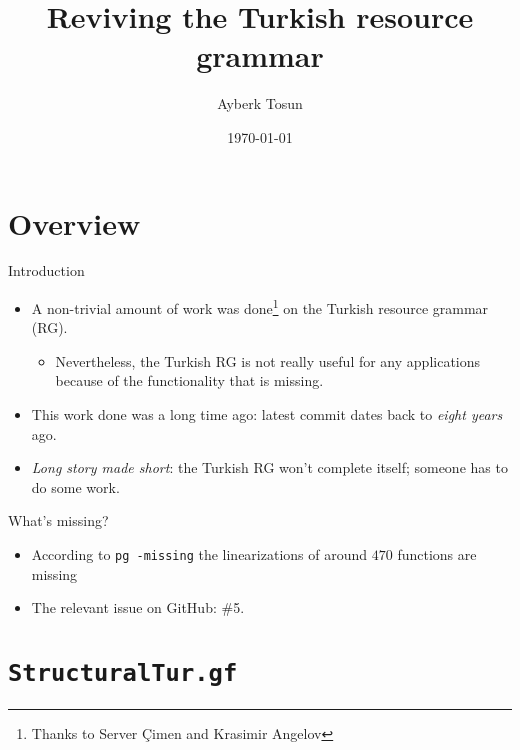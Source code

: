 \documentclass{beamer}
\title{Reviving the Turkish resource grammar}
\date{\today}
\author{Ayberk Tosun}
\institute{Fifth GF Summer School}
\begin{document}
  \maketitle

  \section{Overview}

  \begin{frame}{Introduction}
    \begin{itemize}
      \item<1-> A non-trivial amount of work was done\footnote{Thanks to Server
        \c{C}imen and Krasimir Angelov} on the Turkish resource grammar (RG).
        \begin{itemize}
          \item<2-> Nevertheless, the Turkish RG is not really useful for any
            applications because of the functionality that is missing.
        \end{itemize}
      \item<3-> This work done was a long time ago: latest commit dates back
        to \emph{eight years} ago.
      \item<4-> \emph{Long story made short}: the Turkish RG won't complete
        itself; someone has to do some work.
    \end{itemize}
  \end{frame}

  \begin{frame}{What's missing?}
    \begin{itemize}
      \item<1-> According to \texttt{pg -missing} the linearizations of around
        $470$ functions are missing
      \item<2-> The relevant issue on GitHub: \alert{\#5}.
    \end{itemize}
  \end{frame}

  \section{\texttt{StructuralTur.gf}}
\end{document}
